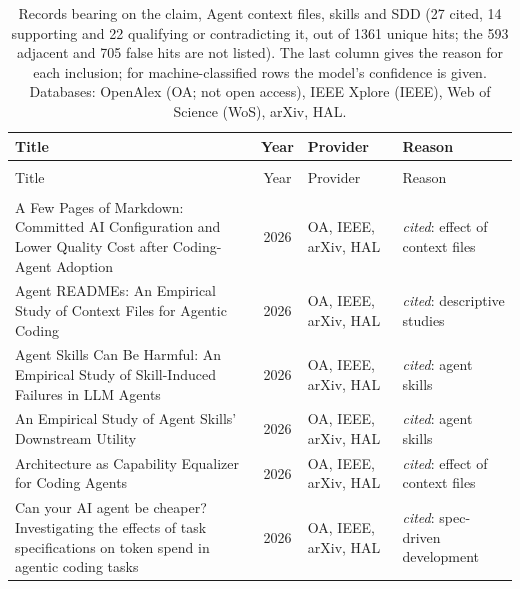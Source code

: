 
\begingroup\footnotesize
\begin{longtable}{@{}%
  >{\raggedright\arraybackslash}p{}c%
  >{\raggedright\arraybackslash}p{}%
  >{\raggedright\arraybackslash}p{}@{}}
\caption{Records bearing on the claim, Agent context files, skills and SDD (27 cited, 14 supporting and 22 qualifying or contradicting it, out of 1361 unique hits; the 593 adjacent and 705 false hits are not listed). The last column gives the reason for each inclusion; for machine-classified rows the model's confidence is given. Databases: OpenAlex (OA; not open access), IEEE Xplore (IEEE), Web of Science (WoS), arXiv, HAL.}\label{tab:lp-agent-context}\\
\toprule
Title & Year & Provider & Reason \\
\midrule
\endfirsthead
\multicolumn{4}{@{}l}{\emph{\tablename~\thetable{} (cont.)}}\\
\toprule
Title & Year & Provider & Reason \\
\midrule
\endhead
\midrule \multicolumn{4}{r@{}}{\emph{continued on next page}}\\
\endfoot
\bottomrule
\endlastfoot
A Few Pages of Markdown: Committed AI Configuration and Lower Quality Cost after Coding-Agent Adoption & 2026 & OA, IEEE, arXiv, HAL & \emph{cited}: effect of context files \\
Agent READMEs: An Empirical Study of Context Files for Agentic Coding & 2026 & OA, IEEE, arXiv, HAL & \emph{cited}: descriptive studies \\
Agent Skills Can Be Harmful: An Empirical Study of Skill-Induced Failures in LLM Agents & 2026 & OA, IEEE, arXiv, HAL & \emph{cited}: agent skills \\
An Empirical Study of Agent Skills' Downstream Utility & 2026 & OA, IEEE, arXiv, HAL & \emph{cited}: agent skills \\
Architecture as Capability Equalizer for Coding Agents & 2026 & OA, IEEE, arXiv, HAL & \emph{cited}: effect of context files \\
Can your AI agent be cheaper? Investigating the effects of task specifications on token spend in agentic coding tasks & 2026 & OA, IEEE, arXiv, HAL & \emph{cited}: spec-driven development \\

\end{longtable}
